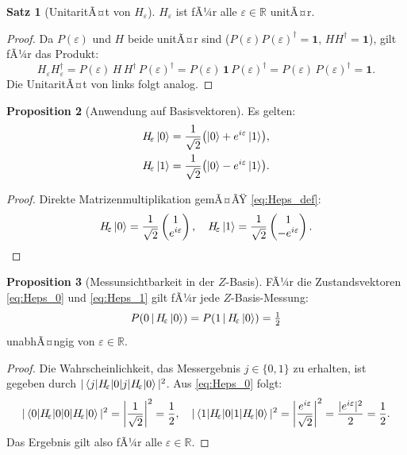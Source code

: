 ﻿\documentclass[11pt,a4paper]{article}
\theoremstyle{definition}
\newtheorem{theorem}{Satz}[section]
\newtheorem{proposition}[theorem]{Proposition}
\newcommand{\eps}{\varepsilon}
\newcommand{\Heps}{H_{\!\varepsilon}}
\newcommand{\R}{\mathbb{R}}
\begin{document}
\begin{theorem}[UnitaritÃ¤t von $\Heps$]
\label{thm:unitary}
  $\Heps$ ist fÃ¼r alle $\eps\in\R$ unitÃ¤r.
\end{theorem}

\begin{proof}
  Da $P(\eps)$ und $H$ beide unitÃ¤r sind ($P(\eps)P(\eps)^\dagger = \mathbf{1}$,
  $HH^\dagger = \mathbf{1}$), gilt fÃ¼r das Produkt:
  \[
    \Heps\Heps^\dagger = P(\eps)\,H\,H^\dagger\,P(\eps)^\dagger
    = P(\eps)\,\mathbf{1}\,P(\eps)^\dagger = P(\eps)\,P(\eps)^\dagger = \mathbf{1}.
  \]
  Die UnitaritÃ¤t von links folgt analog.
\end{proof}

\begin{proposition}[Anwendung auf Basisvektoren]
\label{prop:basis_action}
  Es gelten:
  \begin{align}
    \Heps\ket{0} &= \frac{1}{\sqrt{2}}\bigl(\ket{0} + e^{i\eps}\ket{1}\bigr),
    \label{eq:Heps_0} \\
    \Heps\ket{1} &= \frac{1}{\sqrt{2}}\bigl(\ket{0} - e^{i\eps}\ket{1}\bigr).
    \label{eq:Heps_1}
  \end{align}
\end{proposition}

\begin{proof}
  Direkte Matrizenmultiplikation gemÃ¤ÃŸ \eqref{eq:Heps_def}:
  \[
    \Heps\ket{0} = \frac{1}{\sqrt{2}}\begin{pmatrix}1\\e^{i\eps}\end{pmatrix}, \quad
    \Heps\ket{1} = \frac{1}{\sqrt{2}}\begin{pmatrix}1\\-e^{i\eps}\end{pmatrix}.
  \]
\end{proof}

\begin{proposition}[Messunsichtbarkeit in der $Z$-Basis]
\label{prop:z_blind}
  FÃ¼r die Zustandsvektoren \eqref{eq:Heps_0} und \eqref{eq:Heps_1} gilt fÃ¼r
  jede $Z$-Basis-Messung:
  \[
    P(0\,|\,\Heps\ket{0}) = P(1\,|\,\Heps\ket{0}) = \tfrac{1}{2}
  \]
  unabhÃ¤ngig von $\eps\in\R$.
\end{proposition}

\begin{proof}
  Die Wahrscheinlichkeit, das Messergebnis $j\in\{0,1\}$ zu erhalten, ist
  gegeben durch $|\braket{j|\Heps|0}|^2$.  Aus \eqref{eq:Heps_0} folgt:
  \[
    |\braket{0|\Heps|0}|^2 = \left|\frac{1}{\sqrt{2}}\right|^2 = \frac{1}{2}, \quad
    |\braket{1|\Heps|0}|^2 = \left|\frac{e^{i\eps}}{\sqrt{2}}\right|^2
    = \frac{|e^{i\eps}|^2}{2} = \frac{1}{2}.
  \]
  Das Ergebnis gilt also fÃ¼r alle $\eps\in\R$.
\end{proof}
\end{document}
